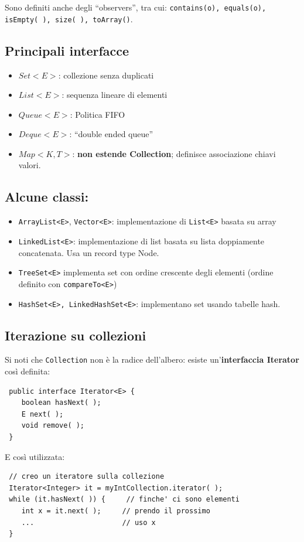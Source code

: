 \documentclass[a4paper,10pt]{article}
\begin{document}
Sono definiti anche degli ``observers'', tra cui: \texttt{contains(o), equals(o), isEmpty( ),
size( ), toArray()}.
\subsection{Principali interfacce}
\begin{itemize}
 \item $Set<E>$: collezione senza duplicati
 \item $List<E>$: sequenza lineare di elementi
 \item $Queue<E>$: Politica FIFO
 \item $Deque<E>$: ``double ended queue''
 \item $Map<K, T>$: \textbf{non estende Collection}; definisce associazione chiavi valori.
\end{itemize}\newpage
\subsection{Alcune classi:}
\begin{itemize}
 \item \texttt{ArrayList<E>}, \texttt{Vector<E>}: implementazione di \texttt{List<E>} basata su array
 \item \texttt{LinkedList<E>}: implementazione di list basata su lista doppiamente concatenata. Usa un record type Node.
 \item \texttt{TreeSet<E>} implementa set con ordine crescente degli elementi (ordine definito con \texttt{compareTo<E>})
 \item \texttt{HashSet<E>, LinkedHashSet<E>}: implementano set usando tabelle hash.
\end{itemize}
\subsection{Iterazione su collezioni}
Si noti che \texttt{Collection} non è la radice dell'albero: esiste un'\textbf{interfaccia Iterator} così definita:
\begin{lstlisting}
 public interface Iterator<E> {
    boolean hasNext( );
    E next( );
    void remove( );
 }
\end{lstlisting}
E così utilizzata:
\begin{lstlisting}
 // creo un iteratore sulla collezione
 Iterator<Integer> it = myIntCollection.iterator( );
 while (it.hasNext( )) {     // finche' ci sono elementi
    int x = it.next( );     // prendo il prossimo
    ...                     // uso x
 }
\end{lstlisting}
\end{document}
